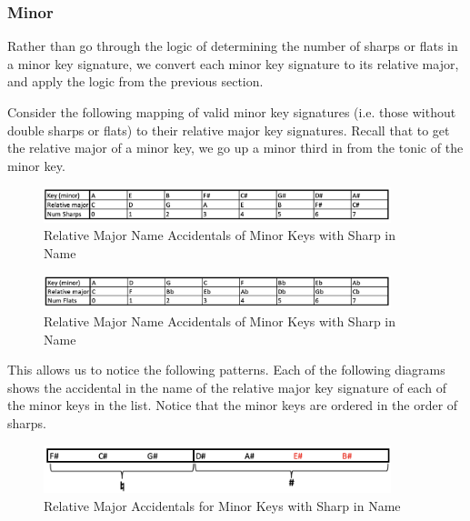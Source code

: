 \documentclass{report}
\begin{document}
\subsubsection{Minor}
Rather than go through the logic of determining the number of sharps or flats in a minor key signature, we convert each minor key signature to its relative major, and apply the logic from the previous section.

Consider the following mapping of valid minor key signatures (i.e. those without double sharps or flats) to their relative major key signatures. Recall that to get the relative major of a minor key, we go up a minor third in from the tonic of the minor key. 

\begin{figure}[h!]
\centering
\includegraphics[width=0.9\textwidth]{images/minor_sharp}
\caption{Relative Major Name Accidentals of Minor Keys with Sharp in Name}
\label{minor_sharp}
\end{figure}


\begin{figure}[h!]
\centering
\includegraphics[width=0.9\textwidth]{images/minor_flat}
\caption{Relative Major Name Accidentals of Minor Keys with Sharp in Name}
\label{minor_flat}
\end{figure}
\newpage

This allows us to notice the following patterns. Each of the following diagrams shows the accidental in the name of the relative major key signature of each of the minor keys in the list. Notice that the minor keys are ordered in the order of sharps. 

\begin{figure}[h!]
\centering
\includegraphics[width=0.9\textwidth]{images/sharp_min_to_maj}
\caption{Relative Major Accidentals for Minor Keys with Sharp in Name}
\label{major_sharp}
\end{figure}
\end{document}
